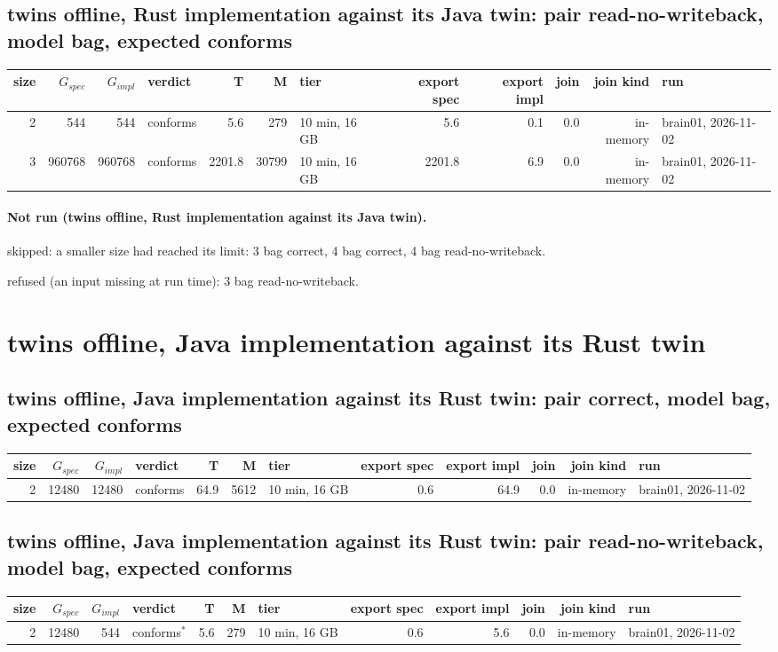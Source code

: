 \documentclass[10pt]{article}
\begin{document}
\subsection*{twins offline, Rust implementation against its Java twin: pair \textsf{read-no-writeback}, model bag, expected conforms}
\begin{longtable}{@{}rrrlrrlrrrrl@{}}
\toprule
size & $G_{\mathit{spec}}$ & $G_{\mathit{impl}}$ & verdict & T & M & tier & export spec & export impl & join & join kind & run \\
\midrule
\endhead
\color{red} 2 & 544 & 544 & conforms & 5.6 & 279 & 10 min, 16 GB & 5.6 & 0.1 & 0.0 & in-memory & brain01, 2026-11-02 \\
\color{red} 3 & 960768 & 960768 & conforms & 2201.8 & 30799 & 10 min, 16 GB & 2201.8 & 6.9 & 0.0 & in-memory & brain01, 2026-11-02 \\
\bottomrule
\end{longtable}
\paragraph{Not run (twins offline, Rust implementation against its Java twin).}
skipped: a smaller size had reached its limit: 3 bag correct, 4 bag correct, 4 bag read-no-writeback.\par
refused (an input missing at run time): 3 bag read-no-writeback.\par
\section*{twins offline, Java implementation against its Rust twin}
\subsection*{twins offline, Java implementation against its Rust twin: pair \textsf{correct}, model bag, expected conforms}
\begin{longtable}{@{}rrrlrrlrrrrl@{}}
\toprule
size & $G_{\mathit{spec}}$ & $G_{\mathit{impl}}$ & verdict & T & M & tier & export spec & export impl & join & join kind & run \\
\midrule
\endhead
\color{red} 2 & 12480 & 12480 & conforms & 64.9 & 5612 & 10 min, 16 GB & 0.6 & 64.9 & 0.0 & in-memory & brain01, 2026-11-02 \\
\bottomrule
\end{longtable}
\subsection*{twins offline, Java implementation against its Rust twin: pair \textsf{read-no-writeback}, model bag, expected conforms}
\begin{longtable}{@{}rrrlrrlrrrrl@{}}
\toprule
size & $G_{\mathit{spec}}$ & $G_{\mathit{impl}}$ & verdict & T & M & tier & export spec & export impl & join & join kind & run \\
\midrule
\endhead
\color{red} 2 & 12480 & 544 & conforms$^{\ast}$ & 5.6 & 279 & 10 min, 16 GB & 0.6 & 5.6 & 0.0 & in-memory & brain01, 2026-11-02 \\
\bottomrule
\end{longtable}
\end{document}
